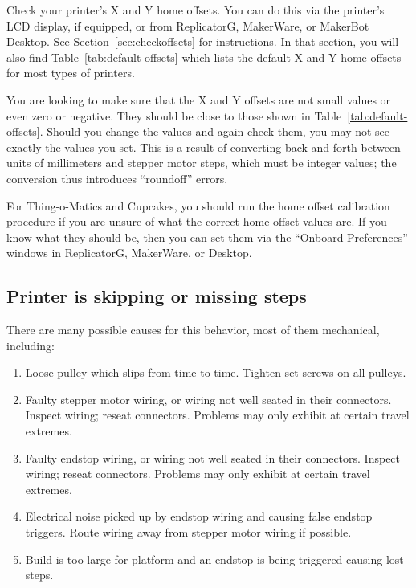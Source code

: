Check your printer's X and Y home offsets.  You can do this via the
printer's LCD display, if equipped, or from ReplicatorG, MakerWare, or
MakerBot Desktop.  See Section~\ref{sec:checkoffsets} for
instructions.  In that section, you will also find
Table~\ref{tab:default-offsets} which lists the default X and Y home
offsets for most types of printers.

You are looking to make sure that the X and Y offsets are not small
values or even zero or negative.  They should be close to those shown
in Table~\ref{tab:default-offsets}.  Should you change the values and
again check them, you may not see exactly the values you set.  This is a result of converting back and forth between units of
millimeters and stepper motor steps, which must be integer values; the conversion
thus introduces ``roundoff'' errors.

For Thing-o-Matics and Cupcakes, you should run the home offset calibration
procedure if you are unsure of what the correct home offset values are.
If you know what they should be, then you can set them via the ``Onboard
Preferences'' windows in ReplicatorG, MakerWare, or Desktop.

\subsection{Printer is skipping or missing steps}
There are many possible causes for this behavior, most of them mechanical, including:

\begin{enumerate}
\item Loose pulley which slips from time to time.  Tighten set screws on all
  pulleys.
\item Faulty stepper motor wiring, or wiring not well seated in their
  connectors. Inspect wiring; reseat connectors.  Problems may only exhibit 
  at certain travel extremes.
\item Faulty endstop wiring, or wiring not well seated in their connectors.
  Inspect wiring; reseat connectors.  Problems may only exhibit at certain
  travel extremes.
\item Electrical noise picked up by endstop wiring and causing false endstop triggers.
  Route wiring away from stepper motor wiring if possible.
\item Build is too large for platform and an endstop is being triggered
  causing lost steps.
\end{enumerate}

